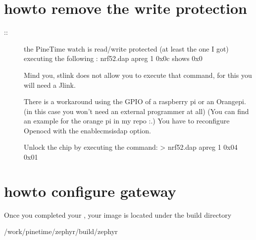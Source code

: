 \documentclass[letterpaper,10pt,english]{sphinxmanual}
\begin{document}
\section{howto remove the write protection}
\label{\detokenize{hacking/writeprotection:howto-remove-the-write-protection}}\begin{description}
\item[{::}] \leavevmode
the PineTime watch is read/write protected (at least the one I got)
executing the following : nrf52.dap apreg 1 0x0c shows 0x0

Mind you, st\sphinxhyphen{}link does not allow you to execute that command, for this you will need a J\sphinxhyphen{}link.

There is a workaround using the GPIO of a raspberry pi or an Orangepi. (in this case you won’t need an external programmer at all)
(You can find an example for the orange pi in my repo :.)
You have to reconfigure Openocd with the \textendash{}enable\sphinxhyphen{}cmsis\sphinxhyphen{}dap option.

Unlock the chip by executing the command:
\textgreater{} nrf52.dap apreg 1 0x04 0x01

\end{description}


\section{howto configure gateway}
\label{\detokenize{hacking/infrastructure:howto-configure-gateway}}\label{\detokenize{hacking/infrastructure:infrastructure}}\label{\detokenize{hacking/infrastructure::doc}}
Once you completed your  , your image is located under the build directory

\begin{sphinxVerbatim}[commandchars=\\\{\}]
  \PYGZti{}/work/pinetime/zephyr/build/zephyr
\end{sphinxVerbatim}

\begin{sphinxVerbatim}[commandchars=\\\{\}]
       
      
      
\end{sphinxVerbatim}
\end{document}
